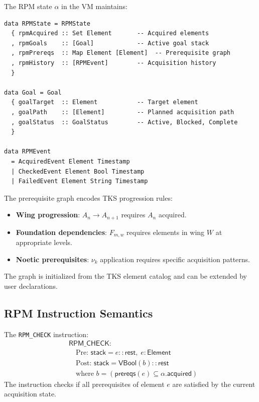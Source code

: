 \begin{definition}
\label{def:rpm-state-structure}
The RPM state $\alpha$ in the VM maintains:
\begin{verbatim}
data RPMState = RPMState
  { rpmAcquired :: Set Element       -- Acquired elements
  , rpmGoals    :: [Goal]            -- Active goal stack
  , rpmPrereqs  :: Map Element [Element]  -- Prerequisite graph
  , rpmHistory  :: [RPMEvent]        -- Acquisition history
  }

data Goal = Goal
  { goalTarget  :: Element           -- Target element
  , goalPath    :: [Element]         -- Planned acquisition path
  , goalStatus  :: GoalStatus        -- Active, Blocked, Complete
  }

data RPMEvent
  = AcquiredEvent Element Timestamp
  | CheckedEvent Element Bool Timestamp
  | FailedEvent Element String Timestamp
\end{verbatim}
\end{definition}

\begin{definition}
\label{def:prereq-graph}
The prerequisite graph encodes TKS progression rules:
\begin{itemize}
  \item \textbf{Wing progression}: $A_n \to A_{n+1}$ requires $A_n$ acquired.
  \item \textbf{Foundation dependencies}: $F_{m,w}$ requires elements in wing $W$ at appropriate levels.
  \item \textbf{Noetic prerequisites}: $\nu_k$ application requires specific acquisition patterns.
\end{itemize}
The graph is initialized from the TKS element catalog and can be extended by user declarations.
\end{definition}

\subsection{RPM Instruction Semantics}
\label{subsec:rpm-semantics}

\begin{definition}
\label{def:rpm-check-semantics}
The \texttt{RPM\_CHECK} instruction:
\begin{align}
&\mathsf{RPM\_CHECK} : \\
&\quad \text{Pre: } \mathsf{stack} = e :: \mathsf{rest}, \; e : \mathsf{Element} \\
&\quad \text{Post: } \mathsf{stack} = \mathsf{VBool}(b) :: \mathsf{rest} \\
&\quad \text{where } b = (\mathsf{prereqs}(e) \subseteq \alpha.\mathsf{acquired})
\end{align}
The instruction checks if all prerequisites of element $e$ are satisfied by the current acquisition state.
\end{definition}

